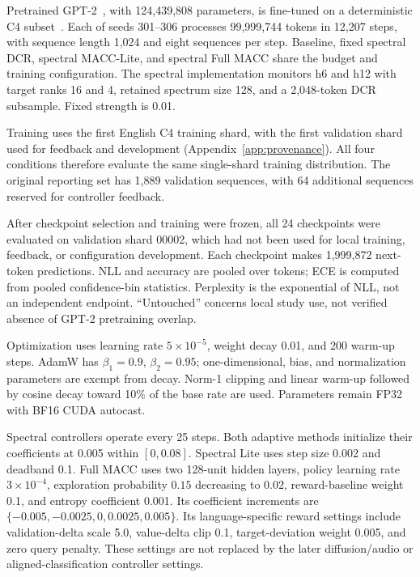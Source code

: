 \documentclass[10pt,a4paper,twocolumn]{article}
\begin{document}
Pretrained GPT-2~\cite{radford2019gpt2}, with 124,439,808 parameters,
is fine-tuned on a deterministic C4 subset~\cite{raffel2020}.
Each of seeds 301--306 processes 99,999,744 tokens in 12,207
steps, with sequence length 1,024 and eight sequences per step.
Baseline, fixed spectral DCR, spectral MACC-Lite, and spectral
Full MACC share the budget and training configuration.
The spectral implementation monitors h6 and h12 with target
ranks 16 and 4, retained spectrum size 128, and a 2,048-token
DCR subsample. Fixed strength is 0.01.

Training uses the first English C4 training shard, with the first
validation shard used for feedback and development
(Appendix~\ref{app:provenance}). All four conditions therefore
evaluate the same single-shard training distribution.
The original reporting set has 1,889 validation sequences, with
64 additional sequences reserved for controller feedback.

After checkpoint selection and training were frozen, all 24
checkpoints were evaluated on validation shard 00002,
which had not been used for local training, feedback,
or configuration development.
Each checkpoint makes 1,999,872 next-token predictions.
NLL and accuracy are pooled over tokens; ECE is computed from
pooled confidence-bin statistics.
Perplexity is the exponential of NLL, not an independent endpoint.
``Untouched'' concerns local study use, not verified absence of
GPT-2 pretraining overlap.

Optimization uses learning rate $5\times10^{-5}$,
weight decay 0.01, and 200 warm-up steps.
AdamW has $\beta_1=0.9$, $\beta_2=0.95$;
one-dimensional, bias, and normalization parameters are exempt
from decay. Norm-1 clipping and linear warm-up followed by
cosine decay toward 10\% of the base rate are used.
Parameters remain FP32 with BF16 CUDA autocast.

Spectral controllers operate every 25 steps.
Both adaptive methods initialize their coefficients at 0.005
within $[0,0.08]$.
Spectral Lite uses step size 0.002 and deadband 0.1.
Full MACC uses two 128-unit hidden
layers, policy learning rate $3\times10^{-4}$,
exploration probability $0.15$ decreasing to $0.02$,
reward-baseline weight 0.1, and entropy coefficient 0.001.
Its coefficient increments are
$\{-0.005,-0.0025,0,0.0025,0.005\}$.
Its language-specific reward settings include validation-delta
scale 5.0, value-delta clip 0.1, target-deviation weight 0.005,
and zero query penalty.
These settings are not replaced by the later diffusion/audio
or aligned-classification controller settings.
\end{document}
